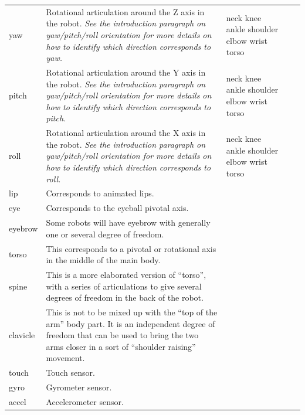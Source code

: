 \begin{center}
\begin{supertabular}{|m{2.312cm}|m{6.776cm}|m{2.629cm}|m{2.471cm}|m{2.1269999cm}|}
\code{{}-} &
 \\\hline
yaw &
Rotational articulation around the Z
axis in the robot. \textit{See the introduction paragraph on
yaw/pitch/roll orientation for more details on how to identify which
direction corresponds to yaw.} &
\ttfamily neck knee ankle shoulder elbow wrist
torso &
\code{{}-} &
 \\\hline
pitch &
Rotational articulation around the Y
axis in the robot. \textit{See the introduction paragraph on
yaw/pitch/roll orientation for more details on how to identify which
direction corresponds to pitch.} &
\ttfamily neck knee ankle shoulder elbow wrist
torso &
\code{{}-} &
 \\\hline
roll &
Rotational articulation around the X
axis in the robot. \textit{See the introduction paragraph on
yaw/pitch/roll orientation for more details on how to identify which
direction corresponds to roll.} &
\ttfamily neck knee ankle shoulder elbow wrist
torso &
\code{{}-} &
 \\\hline
lip &
Corresponds to animated lips. &
 &
 &
 \\\hline
eye &
Corresponds to the eyeball pivotal
axis. &
 &
 &
\code{{}-} \\\hline
eyebrow &
Some robots will have eyebrow with
generally one or several degree of freedom. &
 &
 &
 \\\hline
torso &
This corresponds to a pivotal or
rotational axis in the middle of the main body. &
 &
 &
\code{{}-} \\\hline
spine &
This is a more elaborated version of
“torso”, with a series of articulations to give several degrees of
freedom in the back of the robot. &
 &
 &
\code{{}-} \\\hline
clavicle &
This is not to be mixed up with the
“top of the arm” body part. It is an independent degree of freedom that
can be used to bring the two arms closer in a sort of “shoulder
raising” movement. &
 &
\code{{}-} &
 \\\hline
touch &
Touch sensor. &
 &
\code{{}-} &
 \\\hline
gyro &
Gyrometer sensor. &
 &
\code{{}-} &
 \\\hline
accel  &
Accelerometer sensor. &
 &
\code{{}-} &

\end{supertabular}
\end{center}

